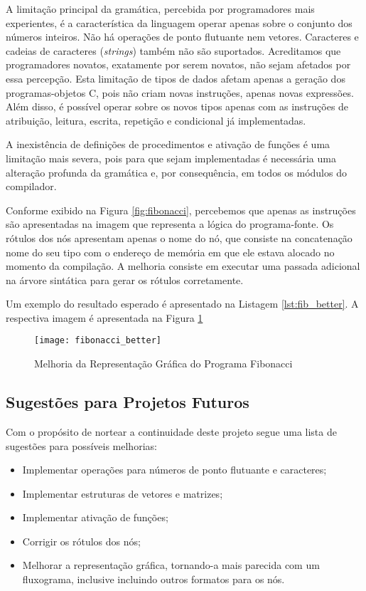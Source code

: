 A limitação principal da gramática, percebida por programadores mais
experientes, é a característica da linguagem operar apenas sobre o conjunto
dos números inteiros. Não há operações de ponto flutuante nem vetores.
Caracteres e cadeias de caracteres (\emph{strings}) também não são
suportados. Acreditamos que programadores novatos, exatamente por serem
novatos, não sejam afetados por essa percepção. Esta limitação de tipos
de dados afetam apenas a geração dos programas-objetos C, pois não criam
novas instruções, apenas novas expressões. Além disso, é possível operar
sobre os novos tipos apenas com as instruções de atribuição, leitura,
escrita, repetição e condicional já implementadas.

A inexistência de definições de procedimentos e ativação de funções é
uma limitação mais severa, pois para que sejam implementadas é necessária
uma alteração profunda da gramática e, por consequência, em todos os
módulos do compilador.

Conforme exibido na Figura \ref{fig:fibonacci}, percebemos que apenas
as instruções são apresentadas na imagem que representa a lógica do
programa-fonte. Os rótulos dos nós apresentam apenas o nome do nó, que
consiste na concatenação nome do seu tipo com o endereço de memória em
que ele estava alocado no momento da compilação. A melhoria consiste em
executar uma passada adicional na árvore sintática para gerar os rótulos
corretamente.

Um exemplo do resultado esperado é apresentado na Listagem
\ref{lst:fib_better}. A respectiva imagem é apresentada na Figura
\ref{fig:fib_better}



\begin{figure}[htb]
	\begin{center}
		\texttt{[image: fibonacci\_better]}
	\end{center}
	\caption{Melhoria da Representação Gráfica do Programa Fibonacci}
	\label{fig:fib_better}
\end{figure}


\subsection{Sugestões para Projetos Futuros}
\label{sec:suggestions}

Com o propósito de nortear a continuidade deste projeto segue uma lista de
sugestões para possíveis melhorias:
\begin{itemize}
	\item Implementar operações para números de ponto flutuante e caracteres;
	\item Implementar estruturas de vetores e matrizes;
	\item Implementar ativação de funções;
	\item Corrigir os rótulos dos nós;
	\item Melhorar a representação gráfica, tornando-a mais parecida com um
	      fluxograma, inclusive incluindo outros formatos para os nós.
\end{itemize}

